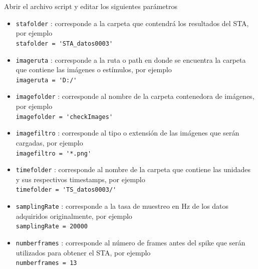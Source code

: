 \documentclass[10pt]{article}
\begin{document}
Abrir el archivo script y editar los siguientes parámetros \\
\begin{itemize}

\item \verb+stafolder+ : corresponde a la carpeta que contendrá los resultados del STA, por ejemplo \\

\verb+stafolder = 'STA_datos0003'+ \\

\item \verb+imageruta+ : corresponde a la ruta o path en donde se encuentra la carpeta que contiene las imágenes o estímulos, por ejemplo \\

\verb+imageruta = 'D:/'+ \\

\item \verb+imagefolder+ : corresponde al nombre de la carpeta contenedora de imágenes, por ejemplo \\

\verb+imagefolder = 'checkImages'+ \\

\item \verb+imagefiltro+ : corresponde al tipo o extensión de las imágenes que serán cargadas, por ejemplo \\

\verb+imagefiltro = '*.png'+\\

\item \verb+timefolder+ : corresponde al nombre de la carpeta que contiene las unidades y sus respectivos timestamps, por ejemplo  \\

\verb+timefolder = 'TS_datos0003/'+ \\

\item \verb+samplingRate+ : corresponde a la tasa de muestreo en Hz de los datos adquiridos originalmente, por ejemplo \\

\verb+samplingRate = 20000+ \\

\item \verb+numberframes+ : corresponde al número de frames antes del spike que serán utilizados para obtener el STA, por ejemplo \\

\verb+numberframes = 13+ \\


\end{itemize}
\end{document}

